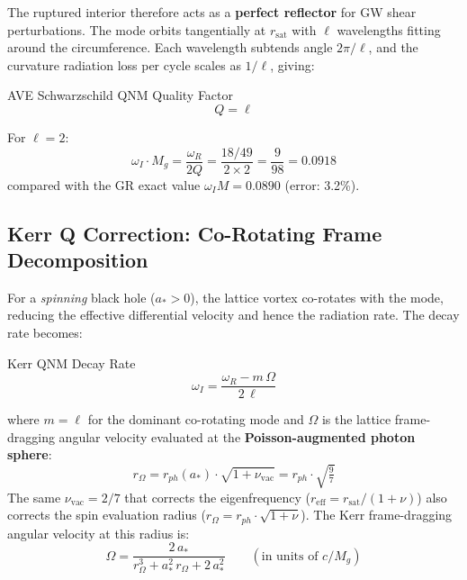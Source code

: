 The ruptured interior therefore acts as a \textbf{perfect reflector} for GW shear perturbations. The mode orbits tangentially at $r_\mathrm{sat}$ with $\ell$ wavelengths fitting around the circumference. Each wavelength subtends angle $2\pi/\ell$, and the curvature radiation loss per cycle scales as $1/\ell$, giving:
\begin{resultbox}{AVE Schwarzschild QNM Quality Factor}
\begin{equation}
    \boxed{Q = \ell}
    \label{eq:ave_qnm_Q}
\end{equation}
\end{resultbox}

\noindent For $\ell = 2$:
\begin{equation}
    \omega_I \cdot M_g = \frac{\omega_R}{2Q} = \frac{18/49}{2 \times 2} = \frac{9}{98} = 0.0918
\end{equation}
compared with the GR exact value $\omega_I M = 0.0890$ (error: 3.2\%).

\subsection{Kerr Q Correction: Co-Rotating Frame Decomposition}
\label{sec:kerr_q_correction}

For a \textit{spinning} black hole ($a_* > 0$), the lattice vortex co-rotates with the mode, reducing the effective differential velocity and hence the radiation rate. The decay rate becomes:
\begin{resultbox}{Kerr QNM Decay Rate}
\begin{equation}
    \boxed{\omega_I = \frac{\omega_R - m\,\Omega}{2\,\ell}}
    \label{eq:kerr_q}
\end{equation}
\end{resultbox}
\noindent where $m = \ell$ for the dominant co-rotating mode and $\Omega$ is the lattice frame-dragging angular velocity evaluated at the \textbf{Poisson-augmented photon sphere}:
\begin{equation}
    r_\Omega = r_{ph}(a_*) \cdot \sqrt{1 + \nu_\mathrm{vac}} = r_{ph} \cdot \sqrt{\tfrac{9}{7}}
    \label{eq:r_omega}
\end{equation}
The same $\nu_\mathrm{vac} = 2/7$ that corrects the eigenfrequency ($r_\mathrm{eff} = r_\mathrm{sat}/(1+\nu)$) also corrects the spin evaluation radius ($r_\Omega = r_{ph} \cdot \sqrt{1+\nu}$). The Kerr frame-dragging angular velocity at this radius is:
\begin{equation}
    \Omega = \frac{2\,a_*}{r_\Omega^3 + a_*^2\,r_\Omega + 2\,a_*^2}
    \qquad (\text{in units of } c/M_g)
\end{equation}

